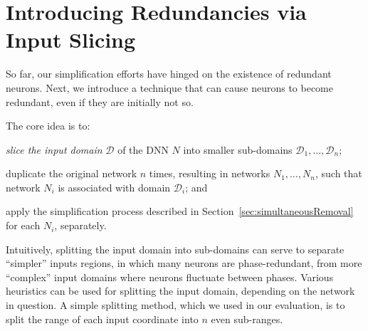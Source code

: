 \documentclass[10pt, conference, twocolumn, compsocconf]{IEEEtran}
\theoremstyle{remark}
\newcommand{\guy}[1]{\marginpar{\textcolor{orange}{Guy: #1}}}
\newcommand{\ori}[1]{\marginpar{\textcolor{blue}{Ori: #1}}}
\begin{document}
\section{Introducing Redundancies via Input Slicing}
\label{sec:input-slicing}
So far, our simplification efforts have hinged on the existence of
redundant neurons. Next, we introduce a technique that can cause
neurons to become redundant, even if they are initially not so.

The core idea is to:
\begin{inparaenum}[(i)]
  \item \emph{slice the input domain} $\mathcal{D}$ of the DNN $N$ into smaller
    sub-domains $\mathcal{D}_1,\ldots, \mathcal{D}_n$;
  \item duplicate the original network $n$ times, resulting in
    networks $N_1,\ldots,N_n$, such that network $N_i$ is associated
    with domain $\mathcal{D}_i$; and
  \item apply the simplification process
    described in
    Section~\ref{sec:simultaneousRemoval} for each $N_i$, separately. 
  \end{inparaenum}
  Intuitively, splitting the input domain into sub-domains can serve
  to separate ``simpler'' inputs regions, in which many neurons are
  phase-redundant, from more ``complex'' input domains where neurons
  fluctuate between phases. Various heuristics can be used for splitting
  the input domain, depending on the network in question. 
  A simple splitting method, which we used in our evaluation, is to
  split the range of each input coordinate into $n$ even sub-ranges.
  
\end{document}
